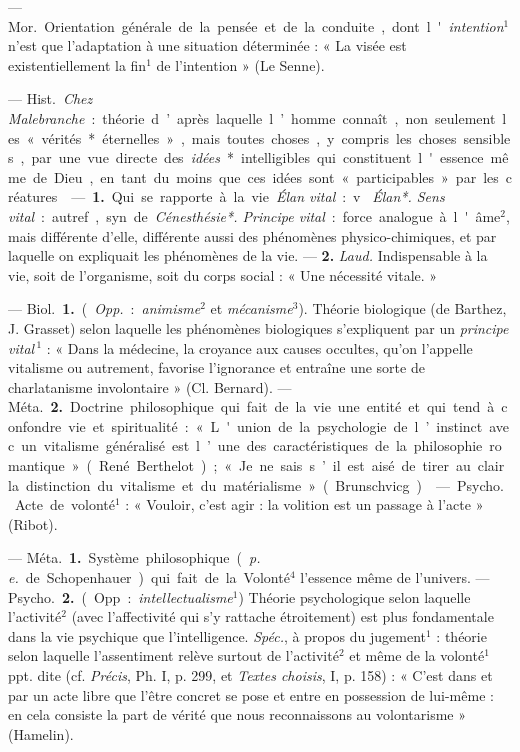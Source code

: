 \begin{itemize}[leftmargin=1cm, label=, itemsep=1pt]
 — \si{Mor.} Orientation générale de la pensée et de la conduite,
dont l'{\it intention}$^1$ n’est que l'adaptation à une situation
déterminée : « La visée est existentiellement la fin$^1$ de l'intention » (Le
Senne).

 —  \si{Hist.} {\it Chez Malebranche} :
théorie d’après laquelle l’homme connaît, non seulement les « vérités*
éternelles », mais toutes choses, y compris les choses sensibles, par une vue
directe des {\it idées}* intelligibles qui constituent l'essence même de
Dieu, en tant du moins que ces idées sont « participables » par les créatures.

 — {\bf 1.} Qui se rapporte à la vie. {\it Élan vital} : v. {\it
Élan*. Sens vital} : autref., syn. de {\it Cénesthésie*. Principe vital} :
force analogue à l'âme$^2$, mais différente d'elle, différente
aussi des phénomènes physico-chimiques, et par laquelle on expliquait les
phénomènes de la vie. —  {\bf 2.} {\it Laud.} Indispensable à la vie, soit de
l’organisme, soit du corps social : « Une nécessité vitale. »

 —  \si{Biol.} {\bf 1.} ({\it Opp.} : {\it animisme}$^2$ et
{\it mécanisme}$^3$). Théorie biologique (de Barthez, J. Grasset) selon
laquelle les phénomènes biologiques s'expliquent par un {\it principe
vital}$\,^1$ : « Dans la médecine, la croyance aux causes occultes, qu’on
l'appelle vitalisme ou autrement, favorise l'ignorance et entraîne une sorte
de charlatanisme involontaire » (Cl. Bernard). — \si{Méta.} {\bf 2.} Doctrine
philosophique qui fait de la vie une entité et qui tend à confondre vie et
spiritualité : « L'union de la psychologie de l’instinct avec un vitalisme
généralisé est l’une des caractéristiques de la philosophie romantique
» (René Berthelot) ; « Je ne sais s’il est aisé de tirer au clair la
distinction du vitalisme et du matérialisme » (Brunschvicg).

 — \si{Psycho.}  Acte de volonté$^1$ : « Vouloir,
c’est agir : la volition est un passage à l'acte » (Ribot).

 —  \si{Méta.} {\bf 1.} Système philosophique
({\it p. e.} de Schopenhauer) qui fait de la Volonté$^4$ l'essence même de
l'univers. — \si{Psycho.}  {\bf 2.} (Opp. : {\it intellectualisme}$^1$)
Théorie psychologique selon laquelle l’activité$^2$ (avec l’affectivité qui
s'y rattache étroitement) est plus fondamentale dans la vie psychique que
l'intelligence. {\it Spéc.}, à propos du jugement$^1$ : théorie selon
laquelle l'assentiment relève surtout de l’activité$^2$ et même de la
volonté$^1$ ppt. dite (cf. {\it Précis}, Ph. I, p. 299, et {\it Textes
choisis}, I, p. 158) : « C’est
dans et par un acte libre que l'être concret se pose et entre en possession
de lui-même : en cela consiste la part de vérité que nous reconnaissons au
volontarisme » (Hamelin).


\end{itemize}
